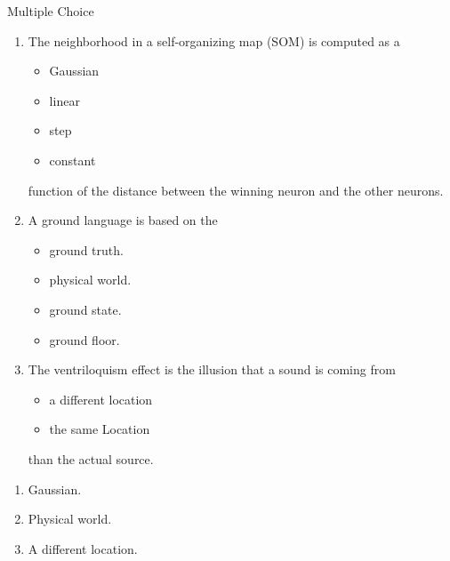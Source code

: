 \documentclass{article}
\begin{document}

\begin{exercise}{Multiple Choice}
  \begin{enumerate}
    \item The neighborhood in a self-organizing map (SOM) is computed as a
          \begin{itemize}
            \item Gaussian
            \item linear
            \item step
            \item constant
          \end{itemize}
          function of the distance between the winning neuron and the other neurons.

    \item A ground language is based on the
          \begin{itemize}
            \item ground truth.
            \item physical world.
            \item ground state.
            \item ground floor.
          \end{itemize}

    \item The ventriloquism effect is the illusion that a sound is coming from
          \begin{itemize}
            \item a different location
            \item the same Location
          \end{itemize}
          than the actual source.
  \end{enumerate}

  \begin{solution}
    \begin{enumerate}
      \item Gaussian.
      \item Physical world.
      \item A different location.
    \end{enumerate}
  \end{solution}
\end{exercise}
\end{document}
